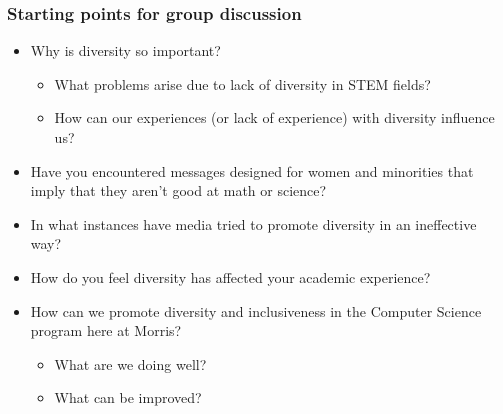 \documentclass{beamer}
\begin{document}
\begin{frame}
\frametitle{Starting points for group discussion}
\begin{itemize}
\item Why is diversity so important? 
\begin{itemize}
\item What problems arise due to lack of diversity in STEM fields?
\item How can our experiences (or lack of experience) with diversity influence us?
\end{itemize}
\item Have you encountered messages designed for women and minorities that imply that they aren’t good at math or science?
\item In what instances have media tried to promote diversity in an ineffective way?
\item How do you feel diversity has affected your academic experience?
\item How can we promote diversity and inclusiveness in the Computer Science program here at Morris?
\begin{itemize}
\item What are we doing well? 
\item What can be improved?
\end{itemize}
\end{itemize}
\end{frame}
\end{document}
